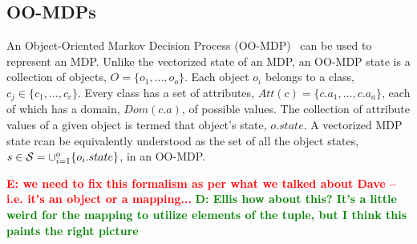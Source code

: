 \documentclass[conference]{IEEEtran}
\newcommand{\dnote}[1]{\textcolor{Green}{\textbf{D: #1}}}
\newcommand{\enote}[1]{\textcolor{Red}{\textbf{E: #1}}}
\begin{document}
\subsection{OO-MDPs}
An Object-Oriented Markov
Decision Process (OO-MDP)~\citep{diuk08} can be used to represent an MDP. Unlike the vectorized state of an MDP, an OO-MDP state is a collection of objects,
$O = \{o_1, \ldots, o_o \}$.  Each object $o_i$ belongs to a
class, $c_j \in  \{c_1, \ldots, c_c\}$. Every class has a set of attributes,
$Att(c) = \{c.a_1, \ldots, c.a_a \}$, each of which has a domain, $Dom(c.a)$, of possible values. The collection of attribute values of a given object is termed that object's state, $o.state$. A vectorized MDP state rcan be equivalently understood as the set
of all the object states, $s \in {\cal S} = \cup_{i = 1}^o \{o_i.state\}$, in an OO-MDP. 





\enote{we need to fix this formalism as per what we talked about Dave -- i.e. it's an object or a mapping...}
\dnote{Ellis how about this? It's a little weird for the mapping to utilize elements of the tuple, but I think this
paints the right picture}
\end{document}
